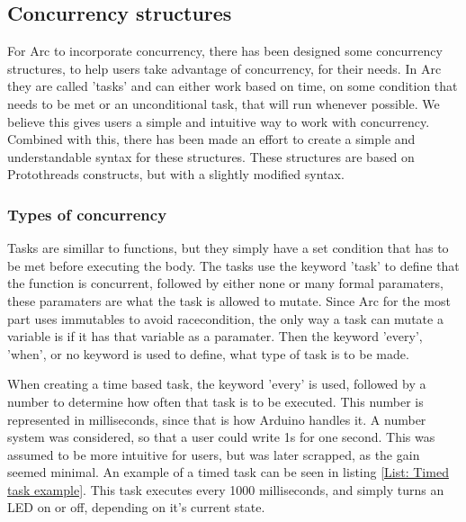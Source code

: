 
\subsection{Concurrency structures}\label{sec:concurrency structures}
For Arc to incorporate concurrency, there has been designed some concurrency structures, to help users take advantage of concurrency, for their needs. In Arc they are called 'tasks' and can either work based on time, on some condition that needs to be met or an unconditional task, that will run whenever possible. We believe this gives users a simple and intuitive way to work with concurrency. Combined with this, there has been made an effort to create a simple and understandable syntax for these structures. These structures are based on Protothreads constructs, but with a slightly modified syntax.


\subsubsection{Types of concurrency}
Tasks are simillar to functions, but they simply have a set condition that has to be met before executing the body. The tasks use the keyword 'task' to define that the function is concurrent, followed by either none or many formal paramaters, these paramaters are what the task is allowed to mutate. Since Arc for the most part uses immutables to avoid racecondition, the only way a task can mutate a variable is if it has that variable as a paramater. Then the keyword 'every', 'when', or no keyword is used to define, what type of task is to be made.

When creating a time based task, the keyword 'every' is used, followed by a number to determine how often that task is to be executed. This number is represented in milliseconds, since that is how Arduino handles it. A number system was considered, so that a user could write 1s for one second. This was assumed to be more intuitive for users, but was later scrapped, as the gain seemed minimal.
An example of a timed task can be seen in listing \ref*{List: Timed task example}. This task executes every 1000 milliseconds, and simply turns an LED on or off, depending on it's current state.

